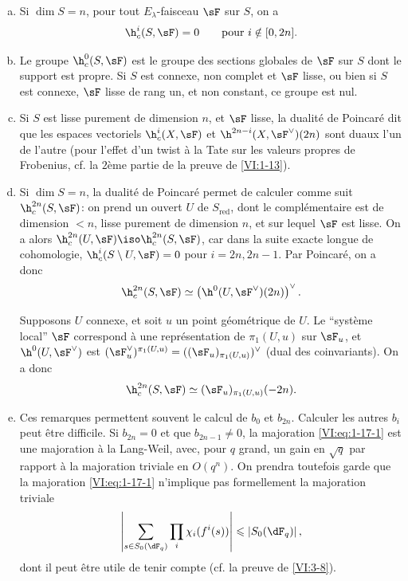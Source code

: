 \begin{enumerate}[a)]
  \item Si $\dim S=n$, pour tout $E_\lambda$-faisceau $\sF$ sur $S$, on a 
    \[
      \h_c^i(S,\sF) = 0 \qquad \text{pour $i\notin [0,2n]$.}
    \]
  \item Le groupe $\h_c^0(S,\sF)$ est le groupe des sections globales de $\sF$ 
    sur $S$ dont le support est propre. Si $S$ est connexe, non complet et 
    $\sF$ lisse, ou bien si $S$ est connexe, $\sF$ lisse de rang un, et non 
    constant, ce groupe est nul.
  \item Si $S$ est lisse purement de dimension $n$, et $\sF$ lisse, la 
    dualité de Poincaré dit que les espaces vectoriels 
    $\h_c^i(X,\sF)$ et $\h^{2n-i}(X,\sF^\vee)(2n)$ sont duaux l'un de l'autre 
    (pour l'effet d'un twist à la Tate sur les valeurs propres de Frobenius, 
    cf. la $2$ème partie de la preuve de \ref{VI:1-13}).
  \item Si $\dim S=n$, la dualité de Poincaré permet de calculer comme 
    suit $\h_c^{2n}(S,\sF)$: on prend un ouvert $U$ de $S_\text{red}$, dont le 
    complémentaire est de dimension $<n$, lisse purement de dimension $n$, et 
    sur lequel $\sF$ est lisse. On a alors 
    $\h_c^{2n}(U,\sF) \iso \h_c^{2n}(S,\sF)$, car dans la suite exacte longue 
    de cohomologie, $\h_c^i(S\setminus U,\sF) = 0$ pour $i=2n,2n-1$. Par 
    Poincaré, on a donc 
    \[
      \h_c^{2n}(S,\sF) \simeq \left(\h^0(U,\sF^\vee)(2n)\right)^\vee \text{.}
    \]
    
    Supposons $U$ connexe, et soit $u$ un point géométrique de $U$. Le 
    ``système local'' $\sF$ correspond à une représentation de 
    $\pi_1(U,u)$ sur $\sF_u$, et $\h^0(U,\sF^\vee)$ est 
    $(\sF_u^\vee)^{\pi_1(U,u)}=((\sF_u)_{\pi_1(U,u)})^\vee$ (dual des 
    coinvariants). On a donc 
\[
      \h_c^{2n}(S,\sF) \simeq (\sF_u)_{\pi_1(U,u)}(-2n) \text{.}
    \]
  \item Ces remarques permettent souvent le calcul de $b_0$ et $b_{2n}$. 
    Calculer les autres $b_i$ peut être difficile. Si $b_{2n}=0$ et que 
    $b_{2n-1}\ne 0$, la majoration \eqref{VI:eq:1-17-1} est une majoration à la 
    Lang-Weil, avec, pour $q$ grand, un gain en $\sqrt q$ par rapport à la 
    majoration triviale en $O(q^n)$. On prendra toutefois garde que la 
    majoration \eqref{VI:eq:1-17-1} n'implique pas formellement la majoration 
    triviale 
    \[
      \left|\sum_{s\in S_0(\dF_q)} \prod_i \chi_i(f^i(s))\right| \leqslant \left| S_0(\dF_q)\right| \text{,}
    \]
    dont il peut être utile de tenir compte (cf. la preuve de \ref{VI:3-8}). 
\end{enumerate}

